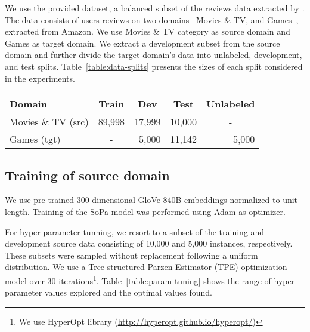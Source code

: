 \documentclass[11pt,a4paper]{article}
\begin{document}
We use the provided dataset, a balanced subset of the reviews data extracted by \citet{mcauley2015image}. The data consists of users reviews on two domains --Movies \& TV, and Games--, extracted from Amazon.
We use Movies \& TV category as source domain and Games as target domain. We extract a development subset from the source domain and further divide the target domain's data into unlabeled, development, and test splits. Table~\ref{table:data-splits} presents the sizes of each split considered in the experiments.

\begin{table*}[]
\centering
\begin{tabular}{|l|c|r|r|c|}
\hline
Domain              & Train                       & \multicolumn{1}{c|}{Dev} & \multicolumn{1}{c|}{Test} & Unlabeled                  \\ \hline
Movies \& TV (src) & \multicolumn{1}{r|}{89,998} & 17,999                   & 10,000                    & -                          \\ \hline
Games (tgt)         & -                           & 5,000                    & 11,142                    & \multicolumn{1}{r|}{5,000} \\ \hline
\end{tabular}
\caption{Size of data splits in source (src) and target (tgt) domains.}
\label{table:data-splits}
\end{table*}

\subsection{Training of source domain}

We use pre-trained 300-dimensional GloVe 840B embeddings \citet{pennington2014glove} normalized to unit length. Training of the {\sc SoPa} model was performed using Adam \cite{kingma2014adam} as optimizer.

For hyper-parameter tunning, we resort to a subset of the training and development source data consisting of 10,000 and 5,000 instances, respectively. These subsets were sampled without replacement following a uniform distribution. We use a Tree-structured Parzen Estimator (TPE) optimization model over 30 iterations\footnote{We use HyperOpt library (\url{http://hyperopt.github.io/hyperopt/})}. Table~\ref{table:param-tuning} shows the range of hyper-parameter values explored and the optimal values found.
\end{document}
